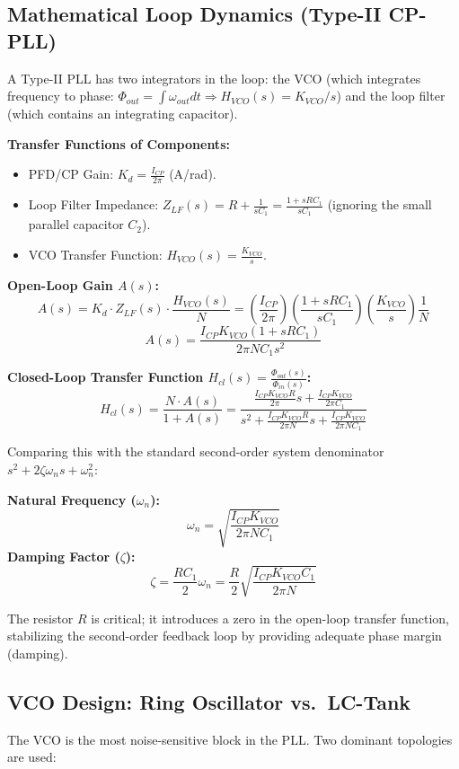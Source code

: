 \documentclass[12pt,a4paper]{article}
\begin{document}
\subsection{Mathematical Loop Dynamics (Type-II CP-PLL)}
A Type-II PLL has two integrators in the loop: the VCO (which integrates frequency to phase: $\Phi_{out} = \int \omega_{out} dt \Rightarrow H_{VCO}(s) = K_{VCO}/s$) and the loop filter (which contains an integrating capacitor).

\textbf{Transfer Functions of Components:}
\begin{itemize}[leftmargin=*, itemsep=2.5pt]
  \item PFD/CP Gain: $K_d = \frac{I_{CP}}{2\pi}$ (A/rad).
  \item Loop Filter Impedance: $Z_{LF}(s) = R + \frac{1}{s C_1} = \frac{1 + s R C_1}{s C_1}$ (ignoring the small parallel capacitor $C_2$).
  \item VCO Transfer Function: $H_{VCO}(s) = \frac{K_{VCO}}{s}$.
\end{itemize}

\textbf{Open-Loop Gain $A(s)$:}
\[
A(s) = K_d \cdot Z_{LF}(s) \cdot \frac{H_{VCO}(s)}{N} = \left(\frac{I_{CP}}{2\pi}\right) \left(\frac{1 + s R C_1}{s C_1}\right) \left(\frac{K_{VCO}}{s}\right) \frac{1}{N}
\]
\[
A(s) = \frac{I_{CP} K_{VCO} (1 + s R C_1)}{2\pi N C_1 s^2}
\]

\textbf{Closed-Loop Transfer Function $H_{cl}(s) = \frac{\Phi_{out}(s)}{\Phi_{in}(s)}$:}
\[
H_{cl}(s) = \frac{N \cdot A(s)}{1 + A(s)} = \frac{\frac{I_{CP} K_{VCO} R}{2\pi} s + \frac{I_{CP} K_{VCO}}{2\pi C_1}}{s^2 + \frac{I_{CP} K_{VCO} R}{2\pi N} s + \frac{I_{CP} K_{VCO}}{2\pi N C_1}}
\]

Comparing this with the standard second-order system denominator $s^2 + 2\zeta\omega_n s + \omega_n^2$:
\begin{tcolorbox}[formulabox, title={\textbf{Type-II CP-PLL Dynamics}}]
\textbf{Natural Frequency ($\omega_n$):}
\[
\omega_n = \sqrt{\frac{I_{CP} K_{VCO}}{2\pi N C_1}}
\]
\textbf{Damping Factor ($\zeta$):}
\[
\zeta = \frac{R C_1}{2} \omega_n = \frac{R}{2} \sqrt{\frac{I_{CP} K_{VCO} C_1}{2\pi N}}
\]
\end{tcolorbox}
The resistor $R$ is critical; it introduces a zero in the open-loop transfer function, stabilizing the second-order feedback loop by providing adequate phase margin (damping).

\subsection{VCO Design: Ring Oscillator vs.~LC-Tank}
The VCO is the most noise-sensitive block in the PLL. Two dominant topologies are used:
\end{document}
